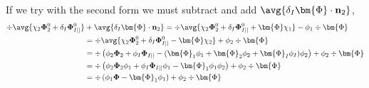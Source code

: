 If we try with the second form we must subtract and add $\avg{\delta_I \bm{\Phi} \cdot \textbf{n}_2}$, 
\begin{align*}
    \div \avg{\chi_2 \mathbf{\Phi}_2^0 + \delta_I \mathbf{\Phi}_{I||}^0}
    & + \avg{\delta_I \bm{\Phi} \cdot \textbf{n}_2}
    =
    \div \avg{\chi_2 \mathbf{\Phi}_2^0 + \delta_I \mathbf{\Phi}_{I||}^0 + \bm{\Phi} \chi_1} 
     - \phi_1 \div \bm{\Phi}\\
    &=
    \div \avg{\chi_2 \mathbf{\Phi}_2^0 + \delta_I \mathbf{\Phi}_{I||}^0 - \bm{\Phi} \chi_2} 
     + \phi_2 \div \bm{\Phi}\\
    &=
    \div \left(\phi_2 \mathbf{\Phi}_2 + \phi_I \mathbf{\Phi}_{I||} - (\bm{\Phi}_1 \phi_1 + \bm{\Phi}_2 \phi_2  + \bm{\Phi}_I \phi_I   ) \phi_2 \right) 
     + \phi_2 \div \bm{\Phi}\\
    &=
    \div \left(\phi_2 \mathbf{\Phi}_2 \phi_1 + \phi_I \mathbf{\Phi}_{I||} \phi_1 - \bm{\Phi}_1 \phi_1 \phi_2 \right) 
     + \phi_2 \div \bm{\Phi}\\
    &=
    \div \left(\phi_1 \mathbf{\Phi} - \bm{\Phi}_1 \phi_1 \right) 
     + \phi_2 \div \bm{\Phi}\\
\end{align*}


